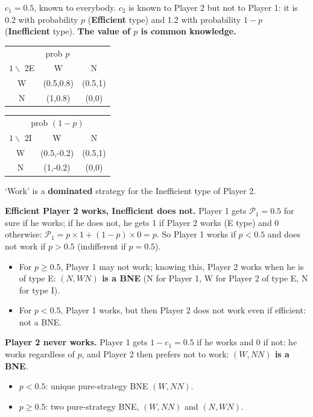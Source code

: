 \documentclass[11pt,a4paper,openany]{book}
\begin{document}
\begin{exbox}[title=Two types of Player 2]
$c_1 = 0.5$, known to everybody. $c_2$ is known to Player 2 but not to Player 1: it is 0.2
with probability $p$ (\textbf{Efficient} type) and 1.2 with probability $1-p$
(\textbf{Inefficient} type). \textbf{The value of $p$ is common knowledge.}
\begin{center}
\begin{tabular}{c|cc}
\multicolumn{3}{c}{prob $p$} \\
$1 \backslash$ 2E & W & N \\ \hline
W & (0.5,0.8) & (0.5,1) \\
N & (1,0.8) & (0,0)
\end{tabular}
\qquad
\begin{tabular}{c|cc}
\multicolumn{3}{c}{prob $(1-p)$} \\
$1 \backslash$ 2I & W & N \\ \hline
W & (0.5,-0.2) & (0.5,1) \\
N & (1,-0.2) & (0,0)
\end{tabular}
\end{center}
`Work' is a \textbf{dominated} strategy for the Inefficient type of Player 2.
\end{exbox}


\begin{propbox}[title=Pure-strategy BNE]
\textbf{Efficient Player 2 works, Inefficient does not.} Player 1 gets $\mathcal{P}_1 = 0.5$
for sure if he works; if he does not, he gets 1 if Player 2 works (E type) and 0 otherwise:
$\mathcal{P}_1 = p \times 1 + (1-p) \times 0 = p$. So Player 1 works if $p < 0.5$ and does not
work if $p > 0.5$ (indifferent if $p = 0.5$).
\begin{itemize}
  \item For $p \ge 0.5$, Player 1 may not work; knowing this, Player 2 works when he is of
        type E: \textbf{$(N, WN)$ is a BNE} (N for Player 1, W for Player 2 of type E, N for
        type I).
  \item For $p < 0.5$, Player 1 works, but then Player 2 does not work even if efficient:
        not a BNE.
\end{itemize}
\textbf{Player 2 never works.} Player 1 gets $1 - c_1 = 0.5$ if he works and 0 if not: he works
regardless of $p$, and Player 2 then prefers not to work: \textbf{$(W, NN)$ is a BNE}.
\begin{itemize}
  \item $p < 0.5$: unique pure-strategy BNE $(W, NN)$.
  \item $p \ge 0.5$: two pure-strategy BNE, $(W, NN)$ and $(N, WN)$.
\end{itemize}
\end{propbox}
\end{document}
